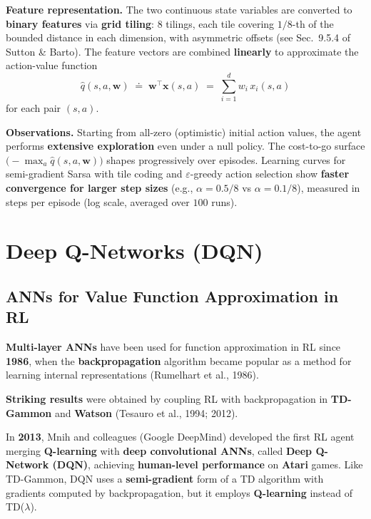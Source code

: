 \documentclass[11pt,a4paper]{article}
\theoremstyle{definition}
\theoremstyle{plain}
\theoremstyle{remark}
\begin{document}
\textbf{Feature representation.} The two continuous state variables are converted to \textbf{binary features} via \textbf{grid tiling}: $8$ tilings, each tile covering $1/8$-th of the bounded distance in each dimension, with asymmetric offsets (see Sec.\ 9.5.4 of Sutton \& Barto). The feature vectors are combined \textbf{linearly} to approximate the action-value function
\[
    \hat{q}(s, a, \mathbf{w}) \;\doteq\; \mathbf{w}^\top \mathbf{x}(s, a) \;=\; \sum_{i=1}^{d} w_i\, x_i(s, a)
\]
for each pair $(s, a)$.

\textbf{Observations.} Starting from all-zero (optimistic) initial action values, the agent performs \textbf{extensive exploration} even under a null policy. The cost-to-go surface $\bigl(-\max_a \hat{q}(s, a, \mathbf{w})\bigr)$ shapes progressively over episodes. Learning curves for semi-gradient Sarsa with tile coding and $\varepsilon$-greedy action selection show \textbf{faster convergence for larger step sizes} (e.g., $\alpha = 0.5/8$ vs $\alpha = 0.1/8$), measured in steps per episode (log scale, averaged over $100$ runs).

\section{Deep Q-Networks (DQN)}

\subsection{ANNs for Value Function Approximation in RL}

\textbf{Multi-layer ANNs} have been used for function approximation in RL since \textbf{1986}, when the \textbf{backpropagation} algorithm became popular as a method for learning internal representations (Rumelhart et al., 1986).

\textbf{Striking results} were obtained by coupling RL with backpropagation in \textbf{TD-Gammon} and \textbf{Watson} (Tesauro et al., 1994; 2012).

In \textbf{2013}, Mnih and colleagues (Google DeepMind) developed the first RL agent merging \textbf{Q-learning} with \textbf{deep convolutional ANNs}, called \textbf{Deep Q-Network (DQN)}, achieving \textbf{human-level performance} on \textbf{Atari} games. Like TD-Gammon, DQN uses a \textbf{semi-gradient} form of a TD algorithm with gradients computed by backpropagation, but it employs \textbf{Q-learning} instead of TD($\lambda$).
\end{document}
